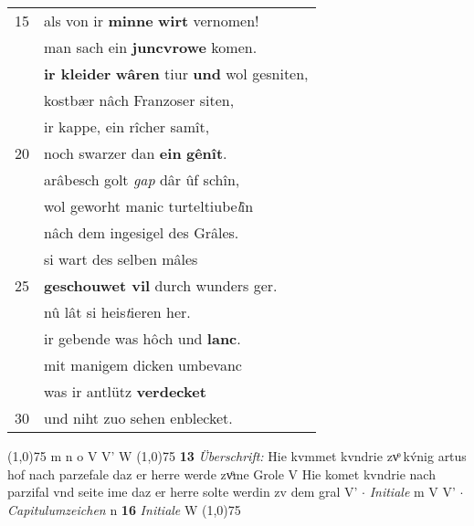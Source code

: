 \documentclass[8pt,a4paper,notitlepage]{article}
\begin{document}
\begin{table}[ht]
\begin{minipage}[t]{0.5\linewidth}
\begin{tabular}{rl}
15 & als von ir \textbf{minne} \textbf{wirt} vernomen!\\ 
 & man sach ein \textbf{juncvrowe} komen.\\ 
 & \textbf{ir kleider} \textbf{wâren} tiur \textbf{und} wol gesniten,\\ 
 & kostbær nâch Franzoser siten,\\ 
 & ir kappe, ein rîcher samît,\\ 
20 & noch swarzer dan \textbf{ein} \textbf{gênît}.\\ 
 & arâbesch golt \textit{gap} dâr ûf schîn,\\ 
 & wol geworht manic turteltiube\textit{l}în\\ 
 & nâch dem ingesigel des Grâles.\\ 
 & si wart des selben mâles\\ 
25 & \textbf{geschouwet vil} durch wunders ger.\\ 
 & nû lât si heis\textit{t}ieren her.\\ 
 & ir gebende was hôch und \textbf{lanc}.\\ 
 & mit manigem dicken umbevanc\\ 
 & was ir antlütz \textbf{verdecket}\\ 
30 & und niht zuo sehen enblecket.\\ 
\end{tabular}
\scriptsize
\line(1,0){75} \newline
m n o V V' W \newline
\line(1,0){75} \newline
\textbf{13} \textit{Überschrift:} Hie kvmmet kvndrie zvͦ kv́nig artus hof nach parzefale daz er herre werde zvͦme Grole V  Hie komet kvndrie nach parzifal vnd seite ime daz er herre solte werdin zv dem gral V'   $\cdot$ \textit{Initiale} m V V'   $\cdot$ \textit{Capitulumzeichen} n  \textbf{16} \textit{Initiale} W  \newline
\line(1,0){75} \newline

\end{minipage}
\end{table}
\end{document}

